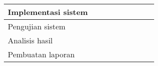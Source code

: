 \documentclass[../Proposal.tex]{subfiles}
\begin{document}
\begin{table}[h!]
{\begin{tabular}{@{}lllllllll@{}}
				\\ \midrule
				Implementasi sistem                            
				&                          
				&                          
				& \cellcolor[HTML]{333333}                          
				& \cellcolor[HTML]{333333} 
				& \cellcolor[HTML]{333333}     
				& \cellcolor[HTML]{333333}                         
				&                          
				&                     
				
				\\ \midrule
				Pengujian sistem                               
				&                          
				&                          
				&                          
				&                          
				& \cellcolor[HTML]{333333} 
				& \cellcolor[HTML]{333333}                          
				& \cellcolor[HTML]{333333}                          
				&                        
				
				\\ \midrule
				Analisis hasil                                 
				&                          
				&                          
				&                          
				&                           
				& \cellcolor[HTML]{333333}   
				& \cellcolor[HTML]{333333}                          
				& \cellcolor[HTML]{333333}                          
				&                     
				
				\\ \midrule
				Pembuatan laporan                              
				&                          
				&                          
				& \cellcolor[HTML]{333333}                         
				& \cellcolor[HTML]{333333}                          
				& \cellcolor[HTML]{333333} 
				& \cellcolor[HTML]{333333}                         
				& \cellcolor[HTML]{333333}                         
				& \cellcolor[HTML]{333333}
				
				\\ \bottomrule
			\end{tabular}
		}
		\label{jadwal-kegiatan}
	\end{table}
\end{document}
